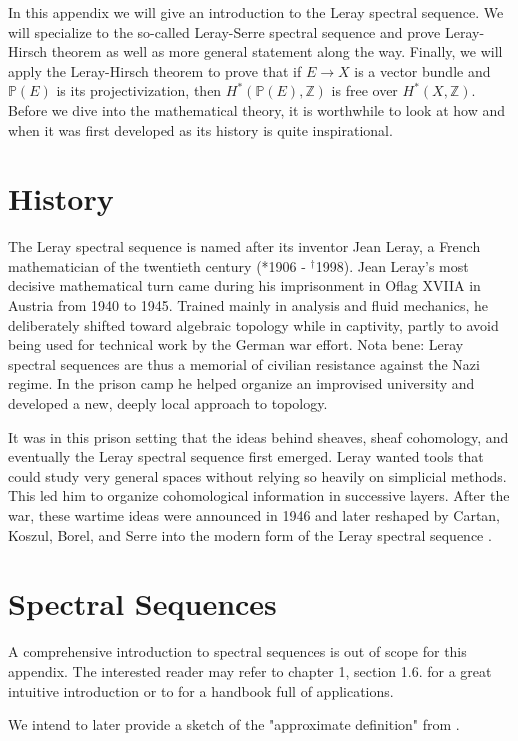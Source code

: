 In this appendix we will give an introduction to the Leray spectral sequence. We will specialize to the so-called Leray-Serre spectral sequence and prove Leray-Hirsch theorem as well as more general statement along the way. Finally, we will apply the Leray-Hirsch theorem to prove that if $E \to X$ is a vector bundle and $\mathbb{P}(E)$ is its projectivization, then $H^\ast(\mathbb{P}(E),\mathbb{Z})$ is free over $H^\ast(X,\mathbb{Z})$. Before we dive into the mathematical theory, it is worthwhile to look at how and when it was first developed as its history is quite inspirational.


\section{History}
The Leray spectral sequence is named after its inventor Jean Leray, a French mathematician of the twentieth century (*1906 - $^\dagger$1998). 
 Jean Leray's most decisive mathematical turn came during his imprisonment in Oflag XVIIA in Austria from 1940 to 1945. Trained mainly in analysis and fluid mechanics, he deliberately shifted toward algebraic topology while in captivity, partly to avoid being used for technical work by the German war effort. Nota bene: Leray spectral sequences are thus a memorial of civilian resistance against the Nazi regime. In the prison camp he helped organize an improvised university and developed a new, deeply local approach to topology. 


 It was in this prison setting that the ideas behind sheaves, sheaf cohomology, and eventually the Leray spectral sequence first emerged. Leray wanted tools that could study very general spaces without relying so heavily on simplicial methods. This led him to organize cohomological information in successive layers. After the war, these wartime ideas were announced in 1946 and later reshaped by Cartan, Koszul, Borel, and Serre into the modern form of the Leray spectral sequence \cite{Miller}. 


\section{Spectral Sequences}
A comprehensive introduction to spectral sequences is out of scope for this appendix. The interested reader may refer to \cite{risingsea} chapter 1, section 1.6. for a great intuitive introduction or  to \cite{mccleary} for a handbook full of applications.

We intend to later provide  a sketch of the "approximate definition" from \cite{risingsea}.

